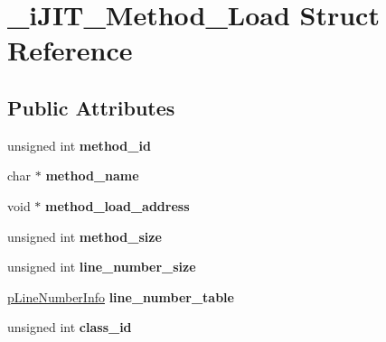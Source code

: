 \hypertarget{struct__i_j_i_t___method___load}{}\section{\+\_\+i\+J\+I\+T\+\_\+\+Method\+\_\+\+Load Struct Reference}
\label{struct__i_j_i_t___method___load}
\subsection*{Public Attributes}
\begin{DoxyCompactItemize}
\item 
unsigned int {\bfseries method\+\_\+id}\hypertarget{struct__i_j_i_t___method___load_a4749361629cb18a2134ffcfb7c5009c3}{}\label{struct__i_j_i_t___method___load_a4749361629cb18a2134ffcfb7c5009c3}

\item 
char $\ast$ {\bfseries method\+\_\+name}\hypertarget{struct__i_j_i_t___method___load_a5a199a135f5c11023ae612a4d78ad7c5}{}\label{struct__i_j_i_t___method___load_a5a199a135f5c11023ae612a4d78ad7c5}

\item 
void $\ast$ {\bfseries method\+\_\+load\+\_\+address}\hypertarget{struct__i_j_i_t___method___load_af528d810e75a9db278ee900432cd17c8}{}\label{struct__i_j_i_t___method___load_af528d810e75a9db278ee900432cd17c8}

\item 
unsigned int {\bfseries method\+\_\+size}\hypertarget{struct__i_j_i_t___method___load_ab68d7a5a9552ec49bd7baa01c03d1f72}{}\label{struct__i_j_i_t___method___load_ab68d7a5a9552ec49bd7baa01c03d1f72}

\item 
unsigned int {\bfseries line\+\_\+number\+\_\+size}\hypertarget{struct__i_j_i_t___method___load_a18fba4fe0f235d81be7e6661c8de2890}{}\label{struct__i_j_i_t___method___load_a18fba4fe0f235d81be7e6661c8de2890}

\item 
\hyperlink{struct___line_number_info}{p\+Line\+Number\+Info} {\bfseries line\+\_\+number\+\_\+table}\hypertarget{struct__i_j_i_t___method___load_a8cc078c6201ccc6fd2e292e82cb061ae}{}\label{struct__i_j_i_t___method___load_a8cc078c6201ccc6fd2e292e82cb061ae}

\item 
unsigned int {\bfseries class\+\_\+id}\hypertarget{struct__i_j_i_t___method___load_a4bc1739953218a3f24f919936c5aa262}{}\label{struct__i_j_i_t___method___load_a4bc1739953218a3f24f919936c5aa262}


\end{DoxyCompactItemize}
